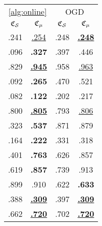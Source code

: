 \begin{tabular}{||@{\ }c@{\ }c@{\ }|@{\ }c@{\ }c}
\toprule
\multicolumn{2}{c}{\cref{alg:online}} & \multicolumn{2}{c}{OGD} \\
{\scriptsize $\mathfrak{C}_{\mathcal{S}}$} & {\scriptsize $\mathfrak{C}_{\mu}$} & {\scriptsize $\mathfrak{C}_{\mathcal{S}}$} & {\scriptsize $\mathfrak{C}_{\mu}$} \\
\midrule
.241 & \underline{.254} & .248 & \underline{{\bf .248}} \\
.096 & {\bf .327} & .397 & .446 \\
.829 & \underline{{\bf .945}} & .958 & \underline{.963} \\
.092 & {\bf .265} & .470 & .521 \\
.082 & {\bf .122} & .202 & .217 \\
.800 & \underline{{\bf .805}} & .793 & \underline{.806} \\
.323 & {\bf .537} & .871 & .879 \\
.164 & {\bf .222} & .331 & .318 \\
.401 & {\bf .763} & .626 & .857 \\
.619 & {\bf .857} & .739 & .913 \\
.899 & .910 & .622 & {\bf .633} \\
.388 & \underline{{\bf .309}} & .397 & \underline{{\bf .309}} \\
.662 & \underline{{\bf .720}} & .702 & \underline{{\bf .720}} \\
\bottomrule
\end{tabular}
